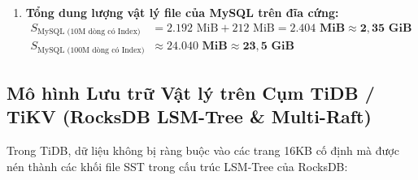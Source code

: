 \begin{enumerate}
  \item \textbf{Tổng dung lượng vật lý file  của MySQL trên đĩa cứng:}
  \begin{align}
    S_{\text{MySQL (10M dòng có Index)}}  &= 2.192\text{ MiB} + 212\text{ MiB} = \mathbf{2.404\text{ MiB} \approx 2,35\text{ GiB}}\\
    S_{\text{MySQL (100M dòng có Index)}} &\approx \mathbf{24.040\text{ MiB} \approx 23,5\text{ GiB}}
  \end{align}
\end{enumerate}

\subsection{Mô hình Lưu trữ Vật lý trên Cụm TiDB / TiKV (RocksDB LSM-Tree \& Multi-Raft)}

Trong TiDB, dữ liệu không bị ràng buộc vào các trang 16KB cố định mà được nén thành các khối file SST trong cấu trúc LSM-Tree của RocksDB:

